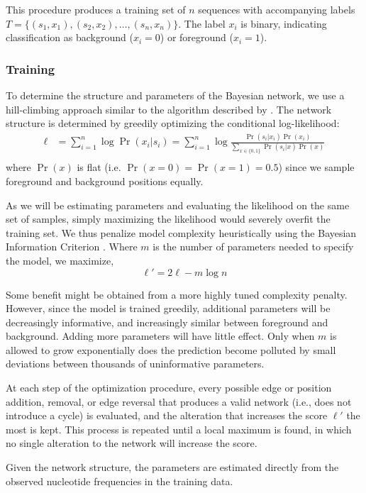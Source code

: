 \documentclass{bioinfo}
\begin{document}
This procedure produces a training set of $n$ sequences with accompanying labels
$T = \{ (s_1, x_1), (s_2, x_2), \dots, (s_n, x_n) \}$. The label $x_i$ is
binary, indicating classification as background ($x_i = 0$) or foreground ($x_i
= 1$).

\subsubsection{Training}


To determine the structure and parameters of the Bayesian network, we use a
hill-climbing approach similar to the algorithm described by \citet{Grossman2004}.
The network structure is determined by greedily optimizing the conditional
log-likelihood:
\begin{align*}
\ell &= \sum_{i=1}^{n} \log \Pr( x_i | s_i ) 
=
\sum_{i=1}^{n} \log \frac{ \Pr(s_i | x_i) \Pr( x_i ) }{
\sum_{x \in \{0,1\}} \Pr( s_i | x ) \Pr(x) } \\
\end{align*}
where $\Pr(x)$ is flat (i.e.  $\Pr( x = 0 ) = \Pr( x = 1 ) =
0.5$) since we sample foreground and background positions equally.

As we will be estimating parameters and evaluating the likelihood on the same
set of samples, simply maximizing the likelihood would severely overfit the
training set. We thus penalize model complexity heuristically using the Bayesian
Information Criterion \citep{Schwarz1978a}. Where $m$ is the number of
parameters needed to specify the model, we maximize, 
$$ \ell' = 2 \ell - m \log n $$

Some benefit might be obtained from a more highly tuned complexity penalty.
However, since the model is trained greedily, additional parameters will be
decreasingly informative, and increasingly similar between foreground and
background. Adding more parameters will have little effect.  Only when $m$ is
allowed to grow exponentially does the prediction become polluted by small
deviations between thousands of uninformative parameters.

At each step of the optimization procedure, every possible edge or position
addition, removal, or edge reversal that produces a valid network (i.e., does not
introduce a cycle) is evaluated, and the alteration that increases the score
$\ell'$ the most is kept.  This process is repeated until a local maximum is
found, in which no single alteration to the network will increase the score.

Given the network structure, the parameters are estimated directly from the
observed nucleotide frequencies in the training data.
\end{document}
